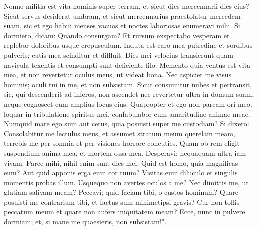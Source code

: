 \begin{biblechapter}  
\verse Nonne militia est vita hominis super terram, et sicut dies mercennarii dies eius? 
\verse Sicut servus desiderat umbram, et sicut mercennarius praestolatur mercedem suam, 
\verse sic et ego habui menses vacuos et noctes laboriosas enumeravi mihi. 
\verse Si dormiero, dicam: Quando consurgam? Et rursum exspectabo vesperam et replebor doloribus usque crepusculum. 
\verse Induta est caro mea putredine et sordibus pulveris; cutis mea scinditur et diffluit. 
\verse Dies mei velocius transierunt quam navicula texentis et consumpti sunt deficiente filo. 
\verse Memento quia ventus est vita mea, et non revertetur oculus meus, ut videat bona. 
\verse Nec aspiciet me visus hominis; oculi tui in me, et non subsistam. 
\verse Sicut consumitur nubes et pertransit, sic, qui descenderit ad inferos, non ascendet 
\verse nec revertetur ultra in domum suam, neque cognoscet eum amplius locus eius. 
\verse Quapropter et ego non parcam ori meo; loquar in tribulatione spiritus mei, confabulabor cum amaritudine animae meae. 
\verse Numquid mare ego sum aut cetus, quia posuisti super me custodiam? 
\verse Si dixero: Consolabitur me lectulus meus, et assumet stratum meum querelam meam, 
\verse terrebis me per somnia et per visiones horrore concuties. 
\verse Quam ob rem eligit suspendium anima mea, et mortem ossa mea. 
\verse Desperavi; nequaquam ultra iam vivam. Parce mihi, nihil enim sunt dies mei. 
\verse Quid est homo, quia magnificas eum? Aut quid apponis erga eum cor tuum? 
\verse Visitas eum diluculo et singulis momentis probas illum. 
\verse Usquequo non avertes oculos a me? Nec dimittis me, ut glutiam salivam meam? 
\verse Peccavi; quid faciam tibi, o custos hominum? Quare posuisti me contrarium tibi, et factus sum mihimetipsi gravis? 
\verse Cur non tollis peccatum meum et quare non aufers iniquitatem meam? Ecce, nunc in pulvere dormiam; et, si mane me quaesieris, non subsistam!". 
\end{biblechapter}

